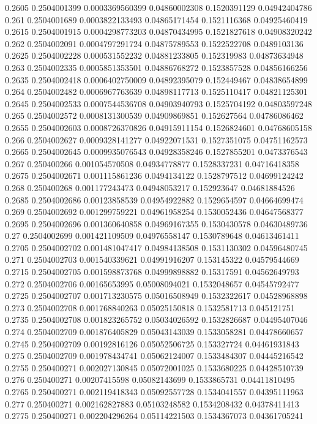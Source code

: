{0.2605 0.2504001399 0.0003369560399 0.04860002308 0.1520391129 0.04942404786
0.261 0.2504001689 0.0003822133493 0.04865171454 0.1521116368 0.04925460419
0.2615 0.2504001915 0.0004298773203 0.04870434995 0.1521827618 0.04908320242
0.262 0.2504002091 0.0004797291724 0.04875789553 0.1522522708 0.0489103136
0.2625 0.2504002228 0.000531552232 0.04881233805 0.152319983 0.04873634948
0.263 0.2504002335 0.0005851353501 0.04886768272 0.1523857528 0.04856166256
0.2635 0.2504002418 0.0006402750009 0.04892395079 0.152449467 0.04838654899
0.264 0.2504002482 0.0006967763639 0.04898117713 0.1525110417 0.04821125301
0.2645 0.2504002533 0.0007544536708 0.04903940793 0.1525704192 0.04803597248
0.265 0.2504002572 0.0008131300539 0.04909869851 0.152627564 0.04786086462
0.2655 0.2504002603 0.0008726370826 0.04915911154 0.1526824601 0.04768605158
0.266 0.2504002627 0.0009328141277 0.04922071531 0.1527351075 0.04751162573
0.2665 0.2504002645 0.0009935076543 0.04928358246 0.1527855201 0.0473376543
0.267 0.250400266 0.001054570508 0.04934778877 0.1528337231 0.04716418358
0.2675 0.2504002671 0.001115861236 0.0494134122 0.1528797512 0.04699124242
0.268 0.250400268 0.001177243473 0.04948053217 0.152923647 0.04681884526
0.2685 0.2504002686 0.00123858539 0.04954922882 0.1529654597 0.04664699474
0.269 0.2504002692 0.001299759221 0.04961958254 0.1530052436 0.04647568377
0.2695 0.2504002696 0.001360640858 0.04969167355 0.1530430578 0.04630489736
0.27 0.2504002699 0.001421109509 0.04976558147 0.1530789648 0.04613461411
0.2705 0.2504002702 0.001481047417 0.04984138508 0.1531130302 0.04596480745
0.271 0.2504002703 0.001540339621 0.04991916207 0.153145322 0.04579544669
0.2715 0.2504002705 0.001598873768 0.04999898882 0.15317591 0.04562649793
0.272 0.2504002706 0.00165653995 0.05008094021 0.1532048657 0.04545792477
0.2725 0.2504002707 0.001713230575 0.05016508949 0.1532322617 0.04528968898
0.273 0.2504002708 0.001768840263 0.05025150818 0.1532581713 0.045121751
0.2735 0.2504002708 0.001823265752 0.05034026592 0.1532826687 0.04495407046
0.274 0.2504002709 0.001876405829 0.05043143039 0.1533058281 0.04478660657
0.2745 0.2504002709 0.00192816126 0.05052506725 0.153327724 0.04461931843
0.275 0.2504002709 0.001978434741 0.05062124007 0.1533484307 0.04445216542
0.2755 0.250400271 0.002027130845 0.05072001025 0.1533680225 0.04428510739
0.276 0.250400271 0.00207415598 0.05082143699 0.1533865731 0.04411810495
0.2765 0.250400271 0.002119418343 0.05092557728 0.1534041557 0.04395111963
0.277 0.250400271 0.002162827883 0.05103248582 0.1534208432 0.04378411413
0.2775 0.250400271 0.002204296264 0.05114221503 0.1534367073 0.04361705241
}
